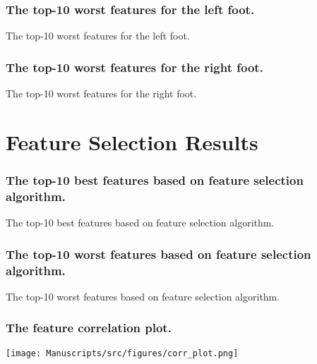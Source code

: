\documentclass{beamer}
\begin{document}
\begin{frame}[shrink=10]
\frametitle{The top-10 worst features for the left foot.}
\tiny
\begin{table}
\centering
\caption{\small The top-10 worst features for the left foot.}

\end{table}
\end{frame}

\begin{frame}[shrink=10]
\frametitle{The top-10 worst features for the right foot.}
\tiny
\begin{table}
\centering
\caption{\small The top-10 worst features for the right foot.}

\end{table}
\end{frame}


\section{Feature Selection Results}
\begin{frame}[shrink=10]
\frametitle{The top-10 best features based on feature selection algorithm.}
\tiny
\begin{table}
\centering
\caption{\small The top-10 best features based on feature selection algorithm.}

\end{table}
\end{frame}

\begin{frame}[shrink=10]
\frametitle{The top-10 worst features based on feature selection algorithm.}
\tiny
\begin{table}
\centering
\caption{\small The top-10 worst features based on feature selection algorithm.}

\end{table}
\end{frame}


\begin{frame}
\frametitle{The feature correlation plot.}
\centering
\texttt{[image: Manuscripts/src/figures/corr\_plot.png]}
\end{frame}
\end{document}
